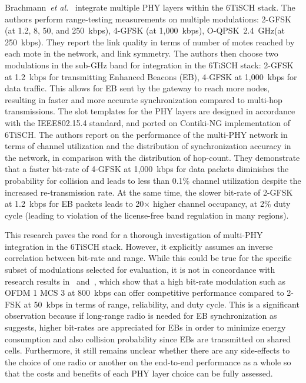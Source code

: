 \documentclass[sensors,article,submit,moreauthors,pdftex]{Definitions/mdpi}
\newcommand{\oqpsk}         {O-QPSK~2.4~GHz}
\newcommand{\etal}          {\textit{et al.}}
\begin{document}
Brachmann~\etal~\cite{brachmann19ieee} integrate multiple PHY layers within the 6TiSCH stack.
The authors perform range-testing measurements on multiple modulations:
     2-GFSK (at 1.2, 8, 50, and 250~kbps),
     4-GFSK (at 1,000~kbps),
     \oqpsk (at   250~kbps). 
They report the link quality in terms of number of motes reached by each mote in the network, and link symmetry.
The authors then choose two modulations in the sub-GHz band for integration in the 6TiSCH stack:
    2-GFSK at 1.2~kbps for transmitting Enhanced Beacons (EB),
    4-GFSK at 1,000~kbps for data traffic. 
This allows for EB sent by the gateway to reach more nodes, resulting in faster and more accurate synchronization compared to multi-hop transmissions. 
The slot templates for the PHY layers are designed in accordance with the IEEE802.15.4 standard,
    and ported on Contiki-NG implementation of 6TiSCH. 
The authors report on the performance of the multi-PHY network in terms of channel utilization and the distribution of synchronization accuracy in the network, in comparison with the distribution of hop-count. 
They demonstrate that a faster bit-rate of 4-GFSK at 1,000~kbps for data packets diminishes the probability for collision and leads to less than 0.1\% channel utilization despite the increased re-transmission rate.
At the same time, the slower bit-rate of 2-GFSK at 1.2~kbps for EB packets leads to 20$\times$ higher channel occupancy,
    at 2\% duty cycle (leading to violation of the license-free band regulation in many regions). 

This research paves the road for a thorough investigation of multi-PHY integration in the 6TiSCH stack.
However, it explicitly assumes an inverse correlation between bit-rate and range.
While this could be true for the specific subset of modulations selected for evaluation, it is not in concordance with research results in~\cite{munoz18overview} and~\cite{munoz18evaluation}, which show that a high bit-rate modulation such as OFDM 1 MCS 3 at 800~kbps can offer competitive performance compared to 2-FSK at 50~kbps in terms of range, reliability, and duty cycle. 
This is a significant observation because if long-range radio is needed for EB synchronization as~\cite{brachmann19ieee} suggests, higher bit-rates are appreciated for EBs in order to minimize energy consumption and also collision probability since EBs are transmitted on shared cells. 
Furthermore, it still remains unclear whether there are any side-effects to the choice of one radio or another  on the end-to-end performance as a whole so that the costs and benefits of each PHY layer choice can be fully assessed.
\end{document}
